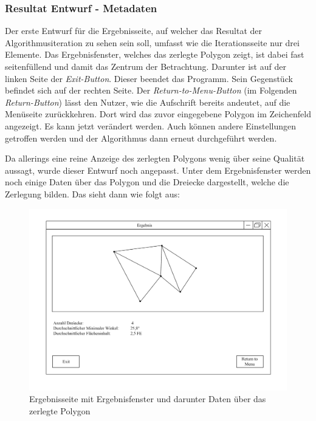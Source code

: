 \subsubsection{Resultat Entwurf - Metadaten}
Der erste Entwurf für die Ergebnisseite, auf welcher das Resultat der Algorithmusiteration zu sehen sein soll, umfasst wie die Iterationsseite nur drei Elemente.
Das Ergebnisfenster, welches das zerlegte Polygon zeigt, ist dabei fast seitenfüllend und damit das Zentrum der Betrachtung.
Darunter ist auf der linken Seite der \emph{Exit-Button}. Dieser beendet das Programm. Sein Gegenstück befindet sich auf der rechten Seite. Der \emph{Return-to-Menu-Button} (im Folgenden \emph{Return-Button})  
lässt den Nutzer, wie die Aufschrift bereits andeutet, auf die Menüseite zurückkehren. Dort wird das zuvor eingegebene Polygon im Zeichenfeld angezeigt. Es kann jetzt verändert werden. Auch können andere Einstellungen getroffen werden 
und der Algorithmus dann erneut durchgeführt werden.

Da allerings eine reine Anzeige des zerlegten Polygons wenig über seine Qualität aussagt, wurde dieser Entwurf noch angepasst. Unter dem Ergebnisfenster werden noch einige Daten über das Polygon und die Dreiecke dargestellt, welche die Zerlegung bilden.
Das sieht dann wie folgt aus:

\begin{figure}[h]
    \includegraphics[width=1\textwidth]{bilder/ergebnis_metadaten.png}
    \caption[Entwurf Ergebnisseite mit Metadaten]{Ergebnisseite mit Ergebnisfenster und darunter Daten über das zerlegte Polygon}
    \label{fig:ergebnis_meta}
\end{figure}

